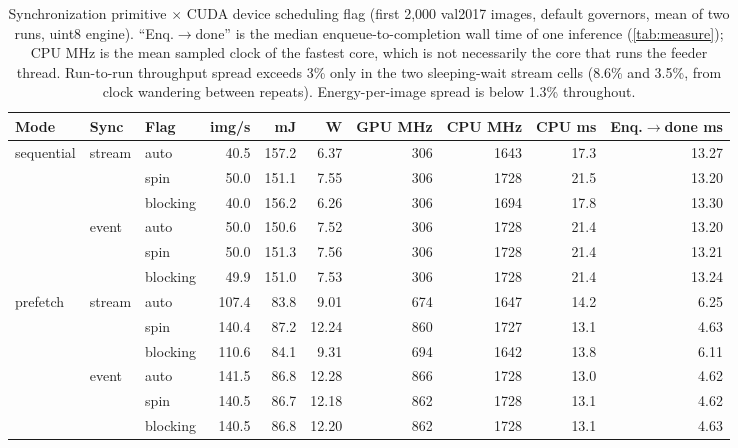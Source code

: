 \begin{table}[t]
\centering
\caption{Synchronization primitive $\times$ CUDA device scheduling flag (first
2,000 val2017 images, default governors, mean of two runs, uint8 engine).
``Enq.$\to$done'' is the median enqueue-to-completion wall time of one
inference (\cref{tab:measure}); CPU MHz is
the mean sampled clock of the fastest core, which is not necessarily the
core that runs the feeder thread. Run-to-run throughput spread exceeds 3\% only in the two sleeping-wait stream cells (8.6\% and 3.5\%, from clock wandering between repeats). Energy-per-image spread is below 1.3\% throughout.}
\label{tab:sched}
\small
\setlength{\tabcolsep}{2.4pt}
\begin{tabular*}{\textwidth}{@{\extracolsep{\fill}}lll rrrrrrr@{}}
\toprule
Mode & Sync & Flag & img/s & mJ & W & GPU MHz & CPU MHz & CPU ms & Enq.$\to$done ms \\
\midrule
sequential & stream & auto & 40.5 & 157.2 & 6.37 & 306 & 1643 & 17.3 & 13.27 \\
 &  & spin & 50.0 & 151.1 & 7.55 & 306 & 1728 & 21.5 & 13.20 \\
 &  & blocking & 40.0 & 156.2 & 6.26 & 306 & 1694 & 17.8 & 13.30 \\
 & event & auto & 50.0 & 150.6 & 7.52 & 306 & 1728 & 21.4 & 13.20 \\
 &  & spin & 50.0 & 151.3 & 7.56 & 306 & 1728 & 21.4 & 13.21 \\
 &  & blocking & 49.9 & 151.0 & 7.53 & 306 & 1728 & 21.4 & 13.24 \\ \midrule
prefetch & stream & auto & 107.4 & 83.8 & 9.01 & 674 & 1647 & 14.2 & 6.25 \\
 &  & spin & 140.4 & 87.2 & 12.24 & 860 & 1727 & 13.1 & 4.63 \\
 &  & blocking & 110.6 & 84.1 & 9.31 & 694 & 1642 & 13.8 & 6.11 \\
 & event & auto & 141.5 & 86.8 & 12.28 & 866 & 1728 & 13.0 & 4.62 \\
 &  & spin & 140.5 & 86.7 & 12.18 & 862 & 1728 & 13.1 & 4.62 \\
 &  & blocking & 140.5 & 86.8 & 12.20 & 862 & 1728 & 13.1 & 4.63 \\
\bottomrule
\end{tabular*}
\end{table}
